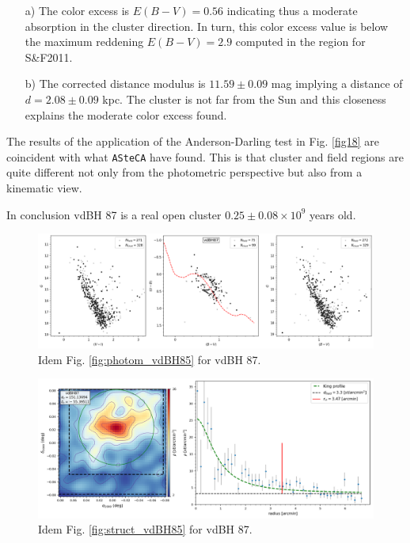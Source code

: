 \documentclass[referee]{aa}
\begin{document}
\begin{itemize}
\item [a)] The color excess is $E(B-V)=0.56$ indicating thus a moderate
    absorption in the cluster direction. In turn, this color excess value is
    below the maximum reddening $E(B-V)=2.9$ computed in the region for 
    S\&F2011.
\item [b)] The corrected distance modulus is $11.59\pm0.09$ mag implying a
distance of $d=2.08\pm0.09$ kpc. The cluster is not far from the Sun and
this closeness explains the moderate color excess found.
\end{itemize}

The results of the application of the Anderson-Darling test in Fig. \ref{fig18}
are coincident with what \texttt{ASteCA} have found. This is that cluster and
field regions are quite different not only from the photometric perspective but
also from a kinematic view.

In conclusion vdBH 87 is a real open cluster $0.25\pm0.08\times10^9$
years old.

\begin{figure}[ht]
    \centering
    \includegraphics[width=\hsize]{../figs/obs_vdBH87.png}
    \caption{Idem Fig. \ref{fig:photom_vdBH85} for vdBH 87.}
    \label{fig15}
\end{figure}

\begin{figure}[ht]
    \centering
    \includegraphics[width=\hsize]{../figs/dmap_vdbh87.png}
    \caption{Idem Fig. \ref{fig:struct_vdBH85} for vdBH 87.}
    \label{fig16}
\end{figure}
\end{document}
